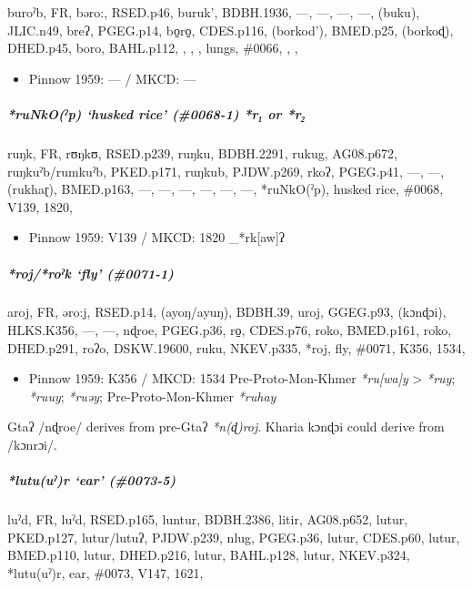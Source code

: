 \documentclass[a4paper,]{article}
\providecommand{\tightlist}{%
  \setlength{\itemsep}{0pt}\setlength{\parskip}{0pt}}
\let\oldsubparagraph\subparagraph
\renewcommand{\subparagraph}[1]{\oldsubparagraph{#1}\mbox{}}
\begin{document}
buroˀb, FR, bəro:, RSED.p46, buruk', BDBH.1936, ---, ---, ---, ---,
(buku), JLIC.n49, breʔ, PGEG.p14, bo̠ro̠, CDES.p116, (borkod'), BMED.p25,
(borkoɖ), DHED.p45, boro, BAHL.p112, , , , lungs, \#0066, , ,

\begin{itemize}
\tightlist
\item
  Pinnow 1959: --- / MKCD: ---
\end{itemize}

\subparagraph{\texorpdfstring{\emph{*ruNkO(ˀp)} `husked rice' (\#0068-1)
\emph{*r₁} or
\emph{*r₂}}{*ruNkO(ˀp) husked rice (\#0068-1) *r₁ or *r₂}}\label{runkoux2c0p-husked-rice-0068-1-r-or-r}

ruŋk, FR, rʊŋkʊ, RSED.p239, ruŋku, BDBH.2291, rukug, AG08.p672,
ruŋkuˀb/rumkuˀb, PKED.p171, ruŋkub, PJDW.p269, rkoʔ, PGEG.p41, ---, ---,
(rukhaɽ), BMED.p163, ---, ---, ---, ---, ---, ---, *ruNkO(ˀp), husked
rice, \#0068, V139, 1820,

\begin{itemize}
\tightlist
\item
  Pinnow 1959: V139 / MKCD: 1820 \_*rk{[}aw{]}ʔ
\end{itemize}

\subparagraph{\texorpdfstring{\emph{*roj}/\emph{*roˀk} `fly'
(\#0071-1)}{*roj/*roˀk fly (\#0071-1)}}\label{rojroux2c0k-fly-0071-1}

aroj, FR, əro:j, RSED.p14, (ayoŋ/ayuŋ), BDBH.39, uroj, GGEG.p93,
(kɔnɖɔi), HLKS.K356, ---, ---, nɖroe, PGEG.p36, ro̠, CDES.p76, roko,
BMED.p161, roko, DHED.p291, roʔo, DSKW.19600, ruku, NKEV.p335, *roj,
fly, \#0071, K356, 1534,

\begin{itemize}
\tightlist
\item
  Pinnow 1959: K356 / MKCD: 1534 Pre-Proto-Mon-Khmer \emph{*ru{[}wa{]}y}
  \textgreater{} \emph{*ruy}; \emph{*ruuy}; \emph{*ruəy};
  Pre-Proto-Mon-Khmer \emph{*ruhay}
\end{itemize}

Gtaʔ /nɖroe/ derives from pre-Gtaʔ \emph{*n(ɖ)roj}. Kharia kɔnɖɔi could
derive from /kɔnrɔi/.

\subparagraph{\texorpdfstring{\emph{*lutu(uˀ)r} `ear'
(\#0073-5)}{*lutu(uˀ)r ear (\#0073-5)}}\label{lutuuux2c0r-ear-0073-5}

luˀd, FR, luˀd, RSED.p165, luntur, BDBH.2386, litir, AG08.p652, lutur,
PKED.p127, lutur/lutuʔ, PJDW.p239, nlug, PGEG.p36, lutur, CDES.p60,
lutur, BMED.p110, lutur, DHED.p216, lutur, BAHL.p128, lutur, NKEV.p324,
*lutu(uˀ)r, ear, \#0073, V147, 1621,
\end{document}
